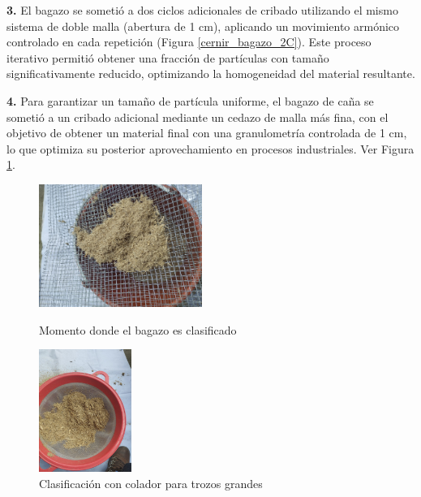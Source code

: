 \documentclass[12pt]{article}
\begin{document}
			
			
			
			
			\textbf{3.}	El bagazo se sometió a dos ciclos adicionales de cribado utilizando el mismo sistema de doble malla (abertura de 1 cm), aplicando un movimiento armónico controlado en cada repetición (Figura \ref{cernir_bagazo_2C}). Este proceso iterativo permitió obtener una fracción de partículas con tamaño significativamente reducido, optimizando la homogeneidad del material resultante.
			
			
			\textbf{4.} Para garantizar un tamaño de partícula uniforme, el bagazo de caña se sometió a un cribado adicional mediante un cedazo de malla más fina, con el objetivo de obtener un material final con una granulometría controlada de 1 cm, lo que optimiza su posterior aprovechamiento en procesos industriales. Ver Figura \ref{cernir_bagazo_cedazo}.
		
		
			\begin{figure}[H]
			\centering
			\begin{minipage}{0.46\textwidth}
				\centering
			\includegraphics[width=\linewidth, height=4cm, keepaspectratio]{imagenes/cernir_bagazo_2}
			\caption{Momento donde el bagazo es clasificado}
			\label{cernir_bagazo_2C}
			\end{minipage}
			\hfill
			\begin{minipage}{0.48\textwidth}
				\centering
				\includegraphics[width=\linewidth, height=4cm, keepaspectratio]{imagenes/cernir_bagazo_cedazo}
				\caption{Clasificación con colador para trozos grandes}
				\label{cernir_bagazo_cedazo}
			\end{minipage}
		\end{figure}
		
\end{document}

